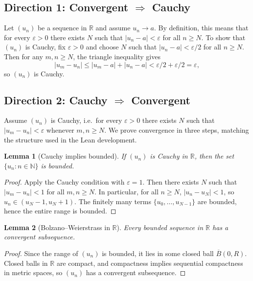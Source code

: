 \documentclass[11pt]{article}
\newtheorem{lemma}{Lemma}
\begin{document}
\subsection*{Direction 1: Convergent \(\Rightarrow\) Cauchy}

Let \((u_n)\) be a sequence in \(\mathbb{R}\) and assume \(u_n \to a\).
By definition, this means that for every \(\varepsilon>0\) there exists \(N\) such that
\(|u_n-a|<\varepsilon\) for all \(n\ge N\).
To show that \((u_n)\) is Cauchy, fix \(\varepsilon>0\) and choose \(N\) such that
\(|u_n-a|<\varepsilon/2\) for all \(n\ge N\).
Then for any \(m,n\ge N\), the triangle inequality gives
\[
|u_m-u_n|
\le |u_m-a| + |u_n-a|
< \varepsilon/2 + \varepsilon/2
= \varepsilon,
\]
so \((u_n)\) is Cauchy.

\subsection*{Direction 2: Cauchy \(\Rightarrow\) Convergent}

Assume \((u_n)\) is Cauchy, i.e.\ for every \(\varepsilon>0\) there exists \(N\) such that
\(|u_m-u_n|<\varepsilon\) whenever \(m,n\ge N\).
We prove convergence in three steps, matching the structure used in the Lean development.

\begin{lemma}[Cauchy implies bounded]
If \((u_n)\) is Cauchy in \(\mathbb{R}\), then the set \(\{u_n : n\in\mathbb{N}\}\) is bounded.
\end{lemma}

\begin{proof}
Apply the Cauchy condition with \(\varepsilon=1\). Then there exists \(N\) such that
\(|u_m-u_n|<1\) for all \(m,n\ge N\). In particular, for all \(n\ge N\),
\(|u_n-u_N|<1\), so \(u_n\in (u_N-1,u_N+1)\). The finitely many terms
\(\{u_0,\dots,u_{N-1}\}\) are bounded, hence the entire range is bounded.
\end{proof}

\begin{lemma}[Bolzano--Weierstrass in \(\mathbb{R}\)]
Every bounded sequence in \(\mathbb{R}\) has a convergent subsequence.
\end{lemma}

\begin{proof}
Since the range of \((u_n)\) is bounded, it lies in some closed ball \(\overline{B}(0,R)\).
Closed balls in \(\mathbb{R}\) are compact, and compactness implies sequential compactness in metric spaces,
so \((u_n)\) has a convergent subsequence.
\end{proof}
\end{document}
